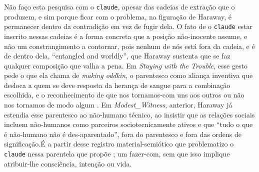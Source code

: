 Não faço esta pesquisa com o \texttt{claude}, apesar das cadeias de extração que o produzem, e sim porque ficar com o problema, na figuração de Haraway, é permanecer dentro da contradição em vez de fugir dela. O fato de o \texttt{claude} estar inscrito nessas cadeias é a forma concreta que a posição não-inocente assume, e não um constrangimento a contornar, pois nenhum de nós está fora da cadeia, e é de dentro dela, \enquote{entangled and worldly}, que Haraway sustenta que se faz qualquer composição que valha a pena. Em \textit{Staying with the Trouble}, esse gesto pede o que ela chama de \emph{making oddkin}, o parentesco como aliança inventiva que desloca a quem se deve resposta da herança de sangue para a combinação escolhida, e o reconhecimento de que nos tornamos-com uns aos outros ou não nos tornamos de modo algum \parencite[pp.~3--4]{Haraway2016Staying}. Em \textit{Modest\_Witness}, anterior, Haraway já estendia esse parentesco ao não-humano técnico, ao insistir que as relações sociais incluem não-humanos como parceiros sociotecnicamente ativos e que \enquote{tudo o que é não-humano não é des-aparentado}, fora do parentesco e fora das ordens de significação.É a partir desse registro material-semiótico que problematizo o \texttt{claude} nessa parentela que propõe \textcite{Haraway2023Ficar}; um fazer-com, sem que isso implique atribuir-lhe consciência, intenção ou vida.

